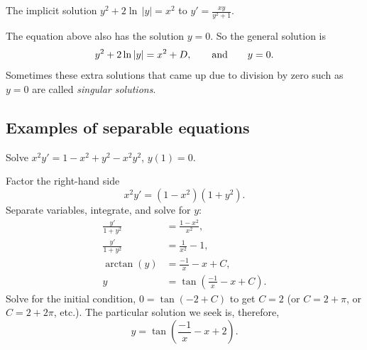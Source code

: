 \begin{myfig}
\capstart
{}
\caption{The implicit solution $y^2+2\ln \, \lvert y\rvert = x^2$
to $y'=\frac{xy}{y^2+1}$.\label{implicitsols:fig}}
\end{myfig}

The equation above also has the solution $y=0$.
So the general solution is 
\begin{equation*}
y^2 + 2 \ln \, \lvert y \rvert = x^2 + D, \qquad \text{and} \qquad y=0.
\avoidbreak
\end{equation*}
Sometimes these extra solutions that came up 
due to division by zero such as
$y=0$
are called \emph{singular solutions}.

\subsection{Examples of separable equations}

\begin{example}
Solve $x^2y' = 1 - x^2+y^2 - x^2y^2$, $y(1) = 0$.

Factor the right-hand side
\begin{equation*}
x^2y' = (1 - x^2)(1+y^2) .
\end{equation*}
Separate variables, integrate, and solve for $y$:
\begin{align*}
\frac{y'}{1+y^2} & = \frac{1 - x^2}{x^2} , \\
\frac{y'}{1+y^2} & = \frac{1}{x^2} - 1 , \\
\operatorname{arctan} (y) & = \frac{-1}{x} - x + C , \\
y & = \tan \left(\frac{-1}{x} - x + C\right) .
\end{align*}
Solve for the initial condition, $0 = \tan(-2+C)$ to get $C=2$ (or $C = 2 +
\pi$, or $C = 2 + 2\pi$, etc.).  The particular solution we seek is, therefore,
\begin{equation*}
y = \tan \left(\frac{-1}{x} - x + 2 \right) .
\end{equation*}
\end{example}

